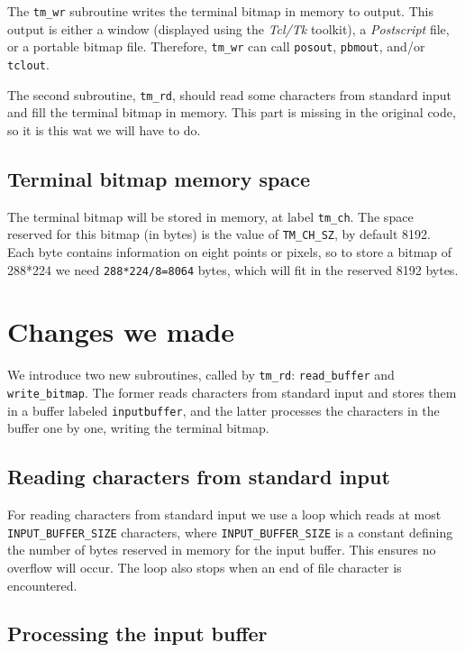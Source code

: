 \documentclass[11pt]{article}
\begin{document}
The \verb|tm_wr| subroutine writes the terminal bitmap in memory to output. This output is either a window (displayed using the \emph{Tcl/Tk} toolkit), a \emph{Postscript} file, or a portable bitmap file. Therefore, \verb|tm_wr| can call \verb|posout|, \verb|pbmout|, and/or \verb|tclout|.

The second subroutine, \verb|tm_rd|, should read some characters from standard input and fill the terminal bitmap in memory. This part is missing in the original code, so it is this wat we will have to do.

\subsection{Terminal bitmap memory space}

The terminal bitmap will be stored in memory, at label \verb|tm_ch|. The space reserved for this bitmap (in bytes) is the value of \verb|TM_CH_SZ|, by default 8192. Each byte contains information on eight points or pixels, so to store a bitmap of 288*224 we need \verb|288*224/8=8064| bytes, which will fit in the reserved 8192 bytes.


\section{Changes we made}

We introduce two new subroutines, called by \verb|tm_rd|: \verb|read_buffer| and \verb|write_bitmap|. The former reads characters from standard input and stores them in a buffer labeled \verb|inputbuffer|, and the latter processes the characters in the buffer one by one, writing the terminal bitmap.

\subsection{Reading characters from standard input}

For reading characters from standard input we use a loop which reads at most \verb|INPUT_BUFFER_SIZE| characters, where \verb|INPUT_BUFFER_SIZE| is a constant defining the number of bytes reserved in memory for the input buffer. This ensures no overflow will occur. The loop also stops when an end of file character is encountered.

\subsection{Processing the input buffer}
\end{document}
